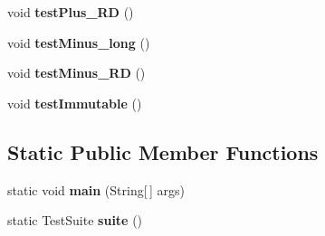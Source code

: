 \begin{DoxyCompactItemize}
\item 
\hypertarget{classorg_1_1joda_1_1time_1_1_test_instant___basics_a074f7deb64d8ea865a12308ed5cab326}{void {\bfseries test\-Plus\-\_\-\-R\-D} ()}\label{classorg_1_1joda_1_1time_1_1_test_instant___basics_a074f7deb64d8ea865a12308ed5cab326}

\item 
\hypertarget{classorg_1_1joda_1_1time_1_1_test_instant___basics_a2ac98c5d5ab722026f5f92ef28defa48}{void {\bfseries test\-Minus\-\_\-long} ()}\label{classorg_1_1joda_1_1time_1_1_test_instant___basics_a2ac98c5d5ab722026f5f92ef28defa48}

\item 
\hypertarget{classorg_1_1joda_1_1time_1_1_test_instant___basics_a8d23df56ea5ab7120dab1738f2921e73}{void {\bfseries test\-Minus\-\_\-\-R\-D} ()}\label{classorg_1_1joda_1_1time_1_1_test_instant___basics_a8d23df56ea5ab7120dab1738f2921e73}

\item 
\hypertarget{classorg_1_1joda_1_1time_1_1_test_instant___basics_a4735af32f6ca01216e651f0fdd9690c1}{void {\bfseries test\-Immutable} ()}\label{classorg_1_1joda_1_1time_1_1_test_instant___basics_a4735af32f6ca01216e651f0fdd9690c1}

\end{DoxyCompactItemize}
\subsection*{Static Public Member Functions}
\begin{DoxyCompactItemize}
\item 
\hypertarget{classorg_1_1joda_1_1time_1_1_test_instant___basics_a63434f74eff12f344e6c2735def34482}{static void {\bfseries main} (String\mbox{[}$\,$\mbox{]} args)}\label{classorg_1_1joda_1_1time_1_1_test_instant___basics_a63434f74eff12f344e6c2735def34482}

\item 
\hypertarget{classorg_1_1joda_1_1time_1_1_test_instant___basics_a959b14071e567e7c411fec7212fa7ee6}{static Test\-Suite {\bfseries suite} ()}\label{classorg_1_1joda_1_1time_1_1_test_instant___basics_a959b14071e567e7c411fec7212fa7ee6}

\end{DoxyCompactItemize}
